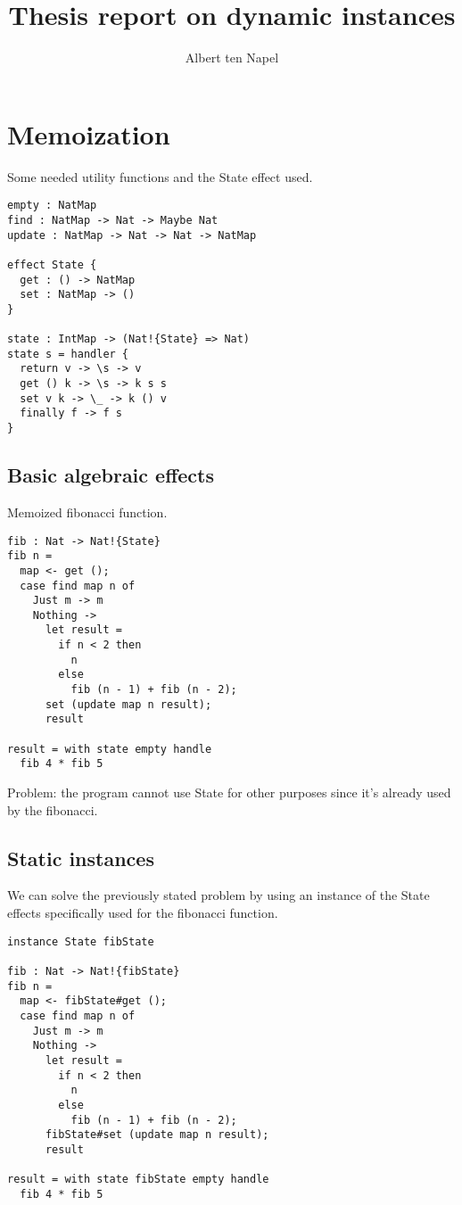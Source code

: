 \documentclass[12pt]{article}
\title{Thesis report on dynamic instances}
\author{Albert ten Napel}
\date{}
\begin{document}
\maketitle

\section{Memoization}

Some needed utility functions and the State effect used.
\begin{verbatim}
empty : NatMap
find : NatMap -> Nat -> Maybe Nat
update : NatMap -> Nat -> Nat -> NatMap

effect State {
  get : () -> NatMap
  set : NatMap -> ()
}

state : IntMap -> (Nat!{State} => Nat)
state s = handler {
  return v -> \s -> v
  get () k -> \s -> k s s
  set v k -> \_ -> k () v
  finally f -> f s 
}
\end{verbatim}

\newpage
\subsection{Basic algebraic effects}

Memoized fibonacci function.
\begin{verbatim}
fib : Nat -> Nat!{State}
fib n =
  map <- get ();
  case find map n of
    Just m -> m
    Nothing ->
      let result =
        if n < 2 then
          n
        else
          fib (n - 1) + fib (n - 2);
      set (update map n result);
      result

result = with state empty handle
  fib 4 * fib 5
\end{verbatim}
Problem: the program cannot use State for other purposes since it's already used by the fibonacci.

\newpage
\subsection{Static instances}

We can solve the previously stated problem by using an instance of the State effects specifically used for the fibonacci function.
\begin{verbatim}
instance State fibState

fib : Nat -> Nat!{fibState}
fib n =
  map <- fibState#get ();
  case find map n of
    Just m -> m
    Nothing ->
      let result =
        if n < 2 then
          n
        else
          fib (n - 1) + fib (n - 2);
      fibState#set (update map n result);
      result

result = with state fibState empty handle
  fib 4 * fib 5
\end{verbatim}
\end{document}
